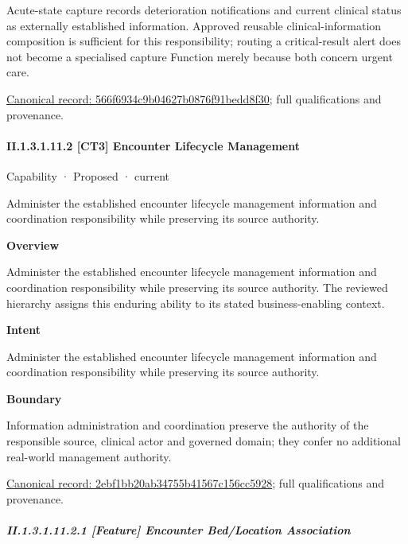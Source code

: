 Acute-state capture records deterioration notifications and current clinical status as externally established information. Approved reusable clinical-information composition is sufficient for this responsibility; routing a critical-result alert does not become a specialised capture Function merely because both concern urgent care.


{\footnotesize \href{../../../../continuum/strategy/capability/feature/566f6934c9b04627b0876f91bedd8f30.md}{Canonical record: 566f6934c9b04627b0876f91bedd8f30}; full qualifications and provenance.}\par
\paragraph*{II.1.3.1.11.2 [CT3] Encounter Lifecycle Management}
\label{navigation:II.1.3.1.11.2}

\label{element:2ebf1bb20ab34755b41567c156cc5928}
{\small Capability · Proposed · current}\par

Administer the established encounter lifecycle management information and coordination responsibility while preserving its source authority.



\textbf{Overview}



Administer the established encounter lifecycle management information and coordination responsibility while preserving its source authority. The reviewed hierarchy assigns this enduring ability to its stated business-enabling context.



\textbf{Intent}



Administer the established encounter lifecycle management information and coordination responsibility while preserving its source authority.



\textbf{Boundary}



Information administration and coordination preserve the authority of the responsible source, clinical actor and governed domain; they confer no additional real-world management authority.


{\footnotesize \href{../../../../continuum/strategy/capability/2ebf1bb20ab34755b41567c156cc5928.md}{Canonical record: 2ebf1bb20ab34755b41567c156cc5928}; full qualifications and provenance.}\par
\subparagraph*{II.1.3.1.11.2.1 [Feature] Encounter Bed/Location Association}
\label{navigation:II.1.3.1.11.2.1}

